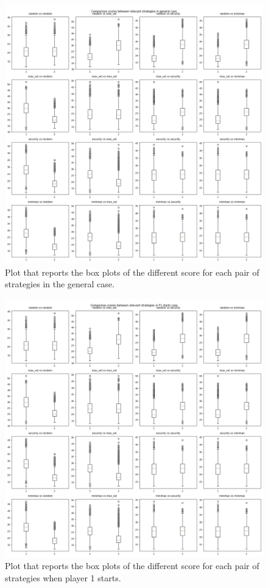 \begin{figure}
	\centering
	\includegraphics[width=1\linewidth]{img/scores_general_rel.png}
	\caption{Plot that reports the box plots of the different score for each pair of strategies in the general case.}
	\label{fig:box_general_rel}
\end{figure}

\begin{figure}
	\centering
	\includegraphics[width=1\linewidth]{img/scores_p1first_rel.png}
	\caption{Plot that reports the box plots of the different score for each pair of strategies when player 1 starts.}
	\label{fig:box_starts_rel}
\end{figure}

